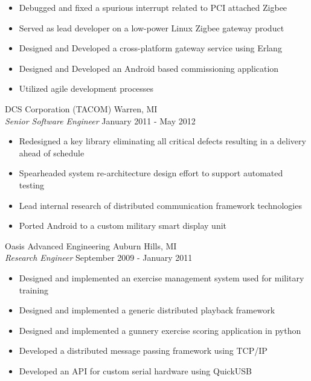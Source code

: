 \documentclass[line]{res}
\begin{document}
\begin{resume}
\begin{itemize}
       \item Debugged and fixed a spurious interrupt related to PCI attached Zigbee
       \item Served as lead developer on a low-power Linux Zigbee gateway product
       \item Designed and Developed a cross-platform gateway service using Erlang
       \item Designed and Developed an Android based commissioning application
       \item Utilized agile development processes
    \end{itemize}
    \vspace{-1mm}
    DCS Corporation (TACOM)  \hfill Warren, MI\\
    {\sl Senior Software Engineer} \hfill January 2011 - May 2012
    \vspace{1mm}
    \begin{itemize}
       \item Redesigned a key library eliminating all critical defects resulting in a delivery ahead of schedule
       \item Spearheaded system re-architecture design effort to support automated testing
       \item Lead internal research of distributed communication framework technologies
       \item Ported Android to a custom military smart display unit
    \end{itemize}

    \vspace{-2mm}
    Oasis Advanced Engineering \hfill Auburn Hills, MI\\
    {\sl Research Engineer} \hfill September 2009 - January 2011
    \vspace{1mm}
    \begin{itemize}
       \item Designed and implemented an exercise management system used for military training
       \item Designed and implemented a generic distributed playback framework
       \item Designed and implemented a gunnery exercise scoring application in python
       \item Developed a distributed message passing framework using TCP/IP
       \item Developed an API for custom serial hardware using QuickUSB
    \end{itemize}


\end{resume}
\end{document}

